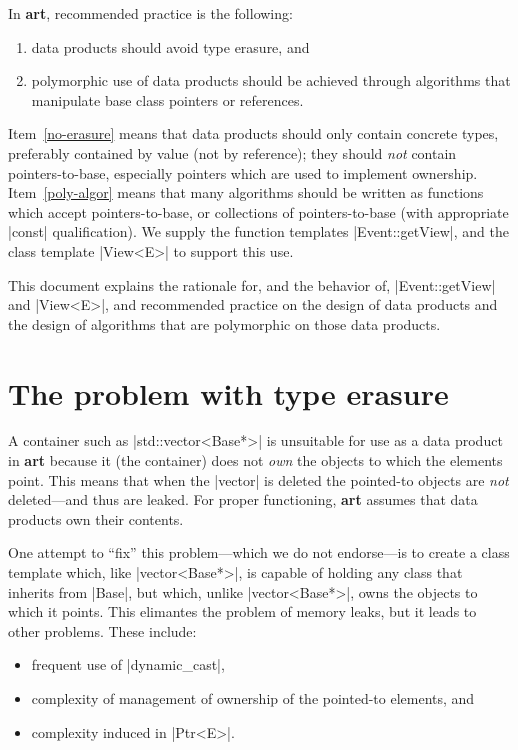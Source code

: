 \documentclass[letterpaper,10pt,article]{memoir}
\newcommand{\product}[1]{\textbf{#1}\xspace}
\newcommand{\art}{\product{art}}
\begin{document}
In \art, recommended practice is the following:
\begin{enumerate}
  \item\label{no-erasure} data products should avoid type erasure, and
  \item\label{poly-algor} polymorphic use of data products should be achieved through
    algorithms that manipulate base class pointers or references.
\end{enumerate}
Item~\ref{no-erasure} means that data products should only contain
concrete types, preferably contained by value (not by reference); they
should \emph{not} contain pointers-to-base, especially pointers which
are used to implement ownership. Item~\ref{poly-algor} means that many
algorithms should be written as functions which accept
pointers-to-base, or collections of pointers-to-base (with appropriate
|const| qualification). We supply the function templates
|Event::getView|, and the class template |View<E>| to support this
use.

This document explains the rationale for, and the behavior of,
|Event::getView| and |View<E>|, and recommended practice on the design
of data products and the design of algorithms that are polymorphic on
those data products.

\chapter{The problem with type erasure}

A container such as |std::vector<Base*>| is unsuitable for use as a
data product in \art because it (the container) does not \emph{own}
the objects to which the elements point. This means that when the
|vector| is deleted the pointed-to objects are \emph{not}
deleted---and thus are leaked. For proper functioning, \art assumes
that data products own their contents.

One attempt to ``fix'' this problem---which we do not endorse---is to
create a class template which, like |vector<Base*>|, is capable of
holding any class that inherits from |Base|, but which, unlike
|vector<Base*>|, owns the objects to which it points. This elimantes
the problem of memory leaks, but it leads to other problems. These
include:
\begin{itemize}
\item frequent use of |dynamic_cast|,
\item complexity of management of ownership of the pointed-to elements, and
\item complexity induced in |Ptr<E>|.
\end{itemize}
\end{document}
